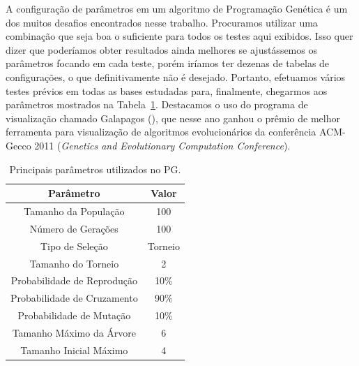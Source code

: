 A configuração de parâmetros em um algoritmo de Programação Genética é um dos muitos desafios encontrados nesse trabalho. Procuramos utilizar uma combinação que seja boa o suficiente para todos os testes aqui exibidos. Isso quer dizer que poderíamos obter resultados ainda melhores se ajustássemos os parâmetros focando em cada teste, porém iríamos ter dezenas de tabelas de configurações, o que definitivamente não é desejado. Portanto, efetuamos vários testes prévios em todas as bases estudadas para, finalmente, chegarmos aos parâmetros mostrados na Tabela~\ref{tab::parametros}.
Destacamos o uso do programa de visualização chamado Galapagos (\cite{galapagos}), que nesse ano ganhou o prêmio de melhor ferramenta para visualização de algoritmos evolucionários da conferência ACM-Gecco 2011 (\textit{Genetics and Evolutionary Computation Conference}).

\begin{table}[!h]
\centering
\caption{Principais parâmetros utilizados no \textsc{PG}.}
\label{tab::parametros}
\begin{tabular}{|c||c|}
\toprule
\textbf{Parâmetro} & \textbf{Valor}\tabularnewline
\midrule
\hline
Tamanho da População & 100\tabularnewline
\hline
Número de Gerações & 100\tabularnewline
\hline
Tipo de Seleção & Torneio\tabularnewline
\hline
Tamanho do Torneio & 2\tabularnewline
\hline
Probabilidade de Reprodução & 10\%\tabularnewline
\hline
Probabilidade de Cruzamento & 90\%\tabularnewline
\hline
Probabilidade de Mutação & 10\%\tabularnewline
\hline
Tamanho Máximo da Árvore & 6\tabularnewline
\hline
Tamanho Inicial Máximo & 4 \tabularnewline
\bottomrule
\end{tabular}
\end{table}


